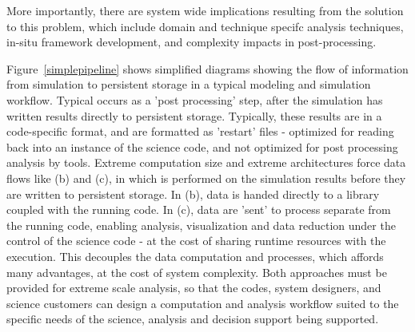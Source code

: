 More importantly, there are system wide implications resulting from the solution
to this problem, which include domain and technique specifc analysis techniques,
in-situ framework development, and complexity impacts in post-processing.

Figure~\ref{simplepipeline} shows simplified diagrams showing the flow of information from simulation to persistent storage in a typical modeling and simulation workflow.  Typical \vda occurs as a 'post processing' step, after the simulation has written results directly to persistent storage.  Typically, these results are in a code-specific format, and are formatted as 'restart' files - optimized for reading back into an instance of the science code, and not optimized for post processing analysis by \vda tools.  Extreme computation size and extreme architectures force data flows like (b) and (c), in which \vda is performed on the simulation results before they are written to persistent storage.  In (b), data is handed directly to a \vda library coupled with the running code.  In (c), data are 'sent' to \vda process separate from the running code, enabling analysis, visualization and data reduction under the control of the science code - at the cost of sharing runtime resources with the \vda execution.  This decouples the data computation and \vda processes, which affords many advantages, at the cost of system complexity.  Both approaches must be provided for extreme scale analysis, so that the codes, system designers, and science customers can design a computation and analysis workflow suited to the specific needs of the science, analysis and decision support being supported.
